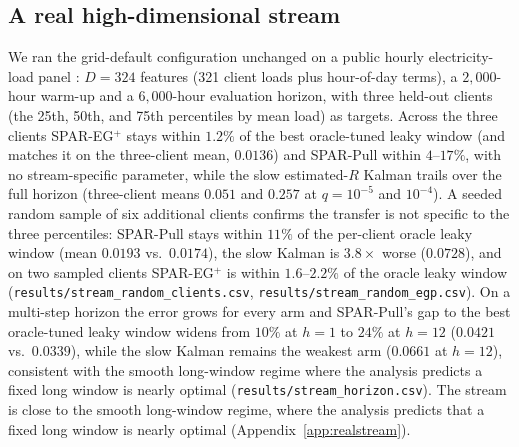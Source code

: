 \documentclass[10pt]{article}
\begin{document}
\subsection{A real high-dimensional stream}
\label{sec:realstream}
We ran the grid-default configuration unchanged on a public hourly electricity-load panel \citep{trindade2015electricity,lai2018lstd}: $D = 324$ features (321 client loads plus hour-of-day terms), a $2{,}000$-hour warm-up and a $6{,}000$-hour evaluation horizon, with three held-out clients (the 25th, 50th, and 75th percentiles by mean load) as targets.
Across the three clients SPAR-EG$^+$ stays within $1.2\%$ of the best oracle-tuned leaky window (and matches it on the three-client mean, $0.0136$) and SPAR-Pull within $4$--$17\%$, with no stream-specific parameter, while the slow estimated-$R$ Kalman trails over the full horizon (three-client means $0.051$ and $0.257$ at $q = 10^{-5}$ and $10^{-4}$). A seeded random sample of six additional clients confirms the transfer is not specific to the three percentiles: SPAR-Pull stays within $11\%$ of the per-client oracle leaky window (mean $0.0193$ vs.\ $0.0174$), the slow Kalman is $3.8\times$ worse ($0.0728$), and on two sampled clients SPAR-EG$^+$ is within $1.6$--$2.2\%$ of the oracle leaky window (\texttt{results/stream\_random\_clients.csv}, \texttt{results/stream\_random\_egp.csv}). On a multi-step horizon the error grows for every arm and SPAR-Pull's gap to the best oracle-tuned leaky window widens from $10\%$ at $h=1$ to $24\%$ at $h=12$ ($0.0421$ vs.\ $0.0339$), while the slow Kalman remains the weakest arm ($0.0661$ at $h=12$), consistent with the smooth long-window regime where the analysis predicts a fixed long window is nearly optimal (\texttt{results/stream\_horizon.csv}).
The stream is close to the smooth long-window regime, where the analysis predicts that a fixed long window is nearly optimal (Appendix~\ref{app:realstream}).
\end{document}
